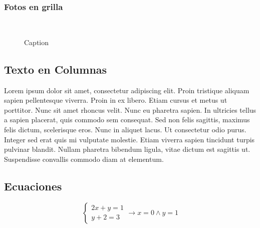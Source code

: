 \subsubsection{Fotos en grilla}
\begin{figure}[H]
        \hfill
        \\
        \hfill
        \caption{Caption}
        \label{fig: grilla de fotos}
    \end{figure}

\subsection{Texto en Columnas}
\setlength{\columnsep}{1cm}
\begin{multicols}{2}
Lorem ipsum dolor sit amet, consectetur adipiscing elit. Proin tristique aliquam sapien pellentesque viverra. Proin in ex libero. Etiam cursus et metus ut porttitor. Nunc sit amet rhoncus velit. Nunc eu pharetra sapien. In ultricies tellus a sapien placerat, quis commodo sem consequat. Sed non felis sagittis, maximus felis dictum, scelerisque eros. Nunc in aliquet lacus. Ut consectetur odio purus. Integer sed erat quis mi vulputate molestie. Etiam viverra sapien tincidunt turpis pulvinar blandit. Nullam pharetra bibendum ligula, vitae dictum est sagittis ut. Suspendisse convallis commodo diam at elementum.
\end{multicols}


\subsection{Ecuaciones}
\begin{equation}
    \begin{cases}
        2x+y=1 \\
        y+2=3
    \end{cases} \longrightarrow x=0 \wedge y=1
\end{equation} 


